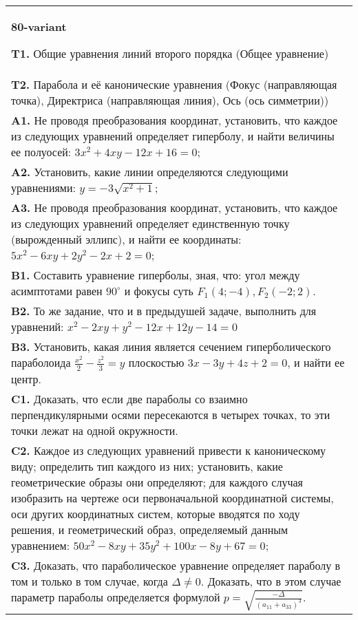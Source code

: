 \documentclass{article}
\begin{document}
\begin{tabular}{m{17cm}}
\textbf{80-variant}
\newline

\textbf{T1.} Общие уравнения линий второго порядка (Общее уравнение) \\
\textbf{T2.} Парабола и её канонические уравнения (Фокус (направляющая точка), Директриса (направляющая линия), Ось (ось симметрии)) \\
\textbf{A1.} Не проводя преобразования координат, установить, что каждое из следующих уравнений определяет гиперболу, и найти величины ее полуосей: $3 x^2+4 x y-12 x+16=0$; \\
\textbf{A2.} Установить, какие линии определяются следующими уравнениями: $y=-3 \sqrt{x^2+1}$; \\
\textbf{A3.} Не проводя преобразования координат, установить, что каждое из следующих уравнений определяет единственную точку (вырожденный эллипс), и найти ее координаты: $5 x^2-6 x y+2 y^2-2 x+2=0$; \\
\textbf{B1.} Составить уравнение гиперболы, зная, что: угол между асимптотами равен $90^{\circ}$ и фокусы суть $F_1(4 ;-4), F_2(-2 ; 2)$. \\
\textbf{B2.} То же задание, что и в предыдушей задаче, выполнить для уравнений: $x^2-2 x y+y^2-12 x+12 y-14=0$ \\
\textbf{B3.} Установить, какая линия является сечением гиперболического параболоида $\frac{x^2}{2}-\frac{z^2}{3}=y$ плоскостью $3 x-3 y+4 z+2=0$, и найти ее центр. \\
\textbf{C1.} Доказать, что если две параболы со взаимно перпендикулярными осями пересекаются в четырех точках, то эти точки лежат на одной окружности. \\
\textbf{C2.} Каждое из следующих уравнений привести к каноническому виду; определить тип каждого из них; установить, какие геометрические образы они определяют; для каждого случая изобразить на чертеже оси первоначальной координатной системы, оси других координатных систем, которые вводятся по ходу решения, и геометрический образ, определяемый данным уравнением: $50 x^2-8 x y+35 y^2+100 x-8 y+67=0$; \\
\textbf{C3.} Доказать, что параболическое уравнение определяет параболу в том и только в том случае, когда $\Delta \neq 0$. Доказать, что в этом случае параметр параболы определяется формулой $p=\sqrt{\frac{-\Delta}{ (a_{11}+a_{33}) ^3}}$. \\

\end{tabular}
\vspace{1cm}
\end{document}
